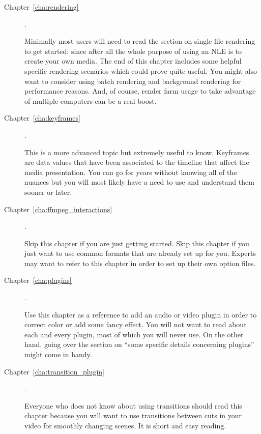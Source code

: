 \begin{description}
    \item[Chapter~\ref{cha:rendering}] .

        Minimally most users will need to read the section on single file rendering to get started; since after all the whole purpose of using an NLE is to create your own media.
        The end of this chapter includes some helpful specific rendering scenarios which could prove quite useful.
        You might also want to consider using batch rendering and background rendering for performance reasons.
        And, of course, render farm usage to take advantage of multiple computers can be a real boost.

    \item[Chapter~\ref{cha:keyframes}] .

        This is a more advanced topic but extremely useful to know.
        Keyframes are data values that have been associated to the timeline that affect the media presentation.
        You can go for years without knowing all of the nuances but you will most likely have a need to use and understand them sooner or later.

    \item[Chapter~\ref{cha:ffmpeg_interactions}] .

        Skip this chapter if you are just getting started. Skip this chapter if you just want to use common
        formats that are already set up for you. Experts may want to refer to this chapter in order to set up their
        own option files.

    \item[Chapter~\ref{cha:plugins}].

        Use this chapter as a reference to add an audio or video plugin in order to correct color or add some fancy effect.
        You will not want to read about each and every plugin, most of which you will never use.
        On the other hand, going over the section on “some specific details concerning plugins” might come in handy.

    \item[Chapter~\ref{cha:transition_plugin}] .

        Everyone who does not know about using transitions should read this chapter because you will want to use transitions between cuts in your video for smoothly changing scenes.
        It is short and easy reading.


\end{description}
